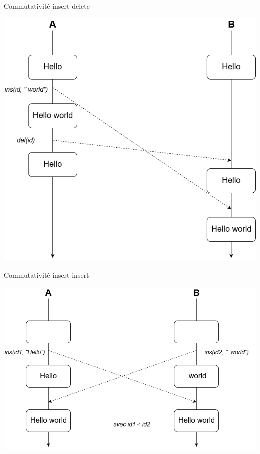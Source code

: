 \documentclass[10pt]{beamer}
\begin{document}
\begin{frame}{Commutativité insert-delete}
  \begin{center}
    \includegraphics[scale=0.35]{fig/insert-delete.png}
  \end{center}
\end{frame}

\begin{frame}{Commutativité insert-insert}
  \begin{center}
    \includegraphics[scale=0.35]{fig/insert-insert.png}
  \end{center}
\end{frame}
\end{document}
